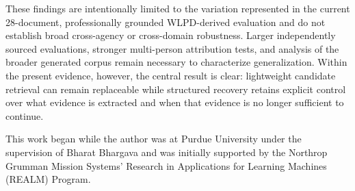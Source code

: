 \documentclass[sigconf,nonacm]{acmart}
\begin{document}
These findings are intentionally limited to the variation represented in the
current 28-document, professionally grounded WLPD-derived evaluation and do not
establish broad cross-agency or cross-domain robustness. Larger independently
sourced evaluations, stronger multi-person attribution tests, and analysis of
the broader generated corpus remain necessary to characterize generalization.
Within the present evidence, however, the central result is clear: lightweight
candidate retrieval can remain replaceable while structured recovery retains
explicit control over what evidence is extracted and when that evidence is no
longer sufficient to continue.

\begin{acks}
This work began while the author was at Purdue University under the supervision
of Bharat Bhargava and was initially supported by the Northrop Grumman Mission
Systems' Research in Applications for Learning Machines (REALM) Program.
\end{acks}

\balance


\end{document}
